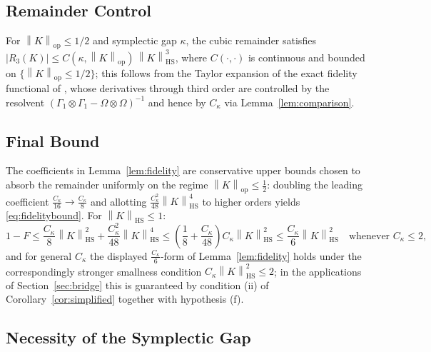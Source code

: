 \documentclass[11pt,a4paper]{article}
\theoremstyle{plain}
\theoremstyle{definition}
\theoremstyle{remark}
\newcommand{\opnorm}[1]{\left\lVert #1 \right\rVert_{\mathrm{op}}}
\newcommand{\hsnorm}[1]{\left\lVert #1 \right\rVert_{\mathrm{HS}}}
\newcommand{\Ckappa}{C_{\kappa}}
\begin{document}
\subsection{Remainder Control}

For $\opnorm{K} \le 1/2$ and symplectic gap $\kappa$, the cubic remainder satisfies
$|R_3(K)| \le C(\kappa, \opnorm{K})\,\hsnorm{K}^3$, where $C(\cdot,\cdot)$ is
continuous and bounded on $\{\opnorm{K} \le 1/2\}$; this follows from the Taylor
expansion of the exact fidelity functional of \cite{BanchiBP15}, whose derivatives
through third order are controlled by the resolvent
$(\Gamma_1\otimes\Gamma_1 - \Omega\otimes\Omega)^{-1}$ and hence by $\Ckappa$ via
Lemma~\ref{lem:comparison}.

\subsection{Final Bound}

The coefficients in Lemma~\ref{lem:fidelity} are conservative upper bounds chosen
to absorb the remainder uniformly on the regime $\opnorm{K} \le \tfrac{1}{2}$:
doubling the leading coefficient $\tfrac{\Ckappa}{16} \to \tfrac{\Ckappa}{8}$ and
allotting $\tfrac{\Ckappa^2}{48}\hsnorm{K}^4$ to higher orders yields
\eqref{eq:fidelitybound}. For $\hsnorm{K} \le 1$:
\begin{equation}
1 - F \le \frac{\Ckappa}{8}\hsnorm{K}^2 + \frac{\Ckappa^2}{48}\hsnorm{K}^4
\le \left(\frac{1}{8} + \frac{\Ckappa}{48}\right)\Ckappa\hsnorm{K}^2
\le \frac{\Ckappa}{6}\hsnorm{K}^2
\quad \text{whenever } \Ckappa \le 2,
\end{equation}
and for general $\Ckappa$ the displayed $\tfrac{\Ckappa}{6}$-form of
Lemma~\ref{lem:fidelity} holds under the correspondingly stronger smallness
condition $\Ckappa\hsnorm{K}^2 \le 2$; in the applications of
Section~\ref{sec:bridge} this is guaranteed by condition (ii) of
Corollary~\ref{cor:simplified} together with hypothesis (f).

\subsection{Necessity of the Symplectic Gap}
\end{document}
